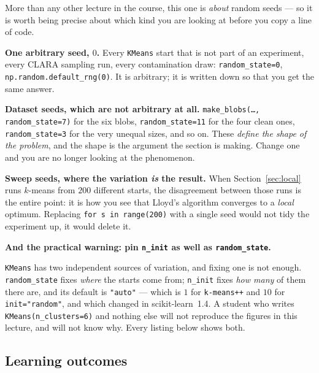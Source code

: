 \documentclass[11pt]{article}
\begin{document}
\begin{keyidea}
More than any other lecture in the course, this one is \emph{about} random
seeds --- so it is worth being precise about which kind you are looking at
before you copy a line of code.

\textbf{One arbitrary seed, $0$.} Every \texttt{KMeans} start that is not part
of an experiment, every CLARA sampling run, every contamination draw:
\texttt{random\_state=0}, \texttt{np.random.default\_rng(0)}. It is arbitrary;
it is written down so that you get the same answer.

\textbf{Dataset seeds, which are not arbitrary at all.}
\texttt{make\_blobs(\dots, random\_state=7)} for the six blobs,
\texttt{random\_state=11} for the four clean ones, \texttt{random\_state=3} for
the very unequal sizes, and so on. These \emph{define the shape of the
problem}, and the shape is the argument the section is making. Change one and
you are no longer looking at the phenomenon.

\textbf{Sweep seeds, where the variation \emph{is} the result.} When
Section~\ref{sec:local} runs $k$-means from $200$ different starts, the
disagreement between those runs is the entire point: it is how you see that
Lloyd's algorithm converges to a \emph{local} optimum. Replacing
\texttt{for s in range(200)} with a single seed would not tidy the experiment
up, it would delete it.

\begin{center}
\textbf{And the practical warning: pin \texttt{n\_init} as well as
\texttt{random\_state}.}
\end{center}

\noindent \texttt{KMeans} has two independent sources of variation, and
fixing one is not enough. \texttt{random\_state} fixes \emph{where} the starts
come from; \texttt{n\_init} fixes \emph{how many} of them there are, and its
default is \texttt{"auto"} --- which is $1$ for \texttt{k-means++} and $10$
for \texttt{init="random"}, and which changed in scikit-learn~1.4. A student
who writes \texttt{KMeans(n\_clusters=6)} and nothing else will not reproduce
the figures in this lecture, and will not know why. Every listing below shows
both.
\end{keyidea}

\subsection{Learning outcomes}
\end{document}
